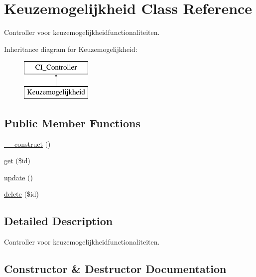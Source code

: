 \hypertarget{class_keuzemogelijkheid}{}\section{Keuzemogelijkheid Class Reference}
\label{class_keuzemogelijkheid}


Controller voor keuzemogelijkheidfunctionaliteiten.  


Inheritance diagram for Keuzemogelijkheid\+:\begin{figure}[H]
\begin{center}
\leavevmode
\includegraphics[height=2.000000cm]{class_keuzemogelijkheid}
\end{center}
\end{figure}
\subsection*{Public Member Functions}
\begin{DoxyCompactItemize}
\item 
\mbox{\hyperlink{class_keuzemogelijkheid_a095c5d389db211932136b53f25f39685}{\+\_\+\+\_\+construct}} ()
\item 
\mbox{\hyperlink{class_keuzemogelijkheid_a50e3bfb586b2f42932a6a93f3fbb0828}{get}} (\$id)
\item 
\mbox{\hyperlink{class_keuzemogelijkheid_a842e4774e3b3601a005b995c02f7e883}{update}} ()
\item 
\mbox{\hyperlink{class_keuzemogelijkheid_a2f8258add505482d7f00ea26493a5723}{delete}} (\$id)
\end{DoxyCompactItemize}


\subsection{Detailed Description}
Controller voor keuzemogelijkheidfunctionaliteiten. 

\subsection{Constructor \& Destructor Documentation}
\mbox{\label{class_keuzemogelijkheid_a095c5d389db211932136b53f25f39685}} 

